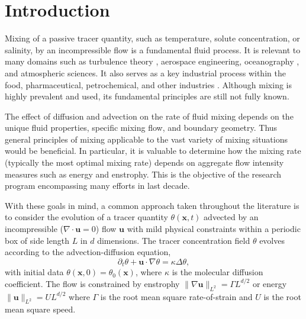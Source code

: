 \documentclass[12pt]{iopart}
\newcommand{\ltwo}[1]{\|#1\|_{L^{2}}}
\renewcommand{\vec}[1]{\mathbf{#1}}
\renewcommand{\u}{\mathbf{u}}
\newcommand{\ppt}[1]{\partial_{t} #1}
\newcommand{\lap}{\Delta }
\begin{document}
%
% 
%

\section{Introduction}
\label{sec:introduction}

Mixing of a passive tracer quantity, such as temperature, solute concentration, or salinity, by an incompressible flow is a fundamental fluid process. It is relevant to many domains such as turbulence theory \cite{Dimotakis2005,Violeau2000a}, aerospace engineering, oceanography \cite{Wunsch2004}, and atmospheric sciences. It also serves as a key industrial process within the food, pharmaceutical, petrochemical, and other industries \cite{paul2004handbook}. Although mixing is highly prevalent and used, its fundamental principles are still not fully known.

The effect of diffusion and advection on the rate of fluid mixing depends on the unique fluid properties, specific mixing flow, and boundary geometry. Thus general principles of mixing applicable to the vast variety of mixing situations would be beneficial. In particular, it is valuable to determine how the mixing rate (typically the most optimal mixing rate) depends on aggregate flow intensity measures such as energy and enstrophy. This is the objective of the research program encompassing many efforts \cite{CS2013,GI2014,JLT2012,JFM2011, Miles2017a,  JLT2012, DF2014, GM2005} in last decade. 

With these goals in mind, a common approach taken throughout the literature is to consider the evolution of a tracer quantity $\theta (\vec{x},t)$ advected by an incompressible ($\nabla \cdot\vec{u}=0$) flow $\vec{u}$ with mild physical constraints within a periodic box  of side length $L$ in $d$ dimensions. The tracer concentration field $\theta$ evolves according to the advection-diffusion equation,
\begin{equation}
	\label{eq:PDE_advection}
	\ppt{\theta}+\mathbf{u}\cdot \nabla \theta=\kappa \lap\theta,
\end{equation}
with initial data $\theta(\mathbf{x},0)=\theta_{0}(\mathbf{x})$, where $\kappa$ is the molecular diffusion coefficient. The flow is constrained by enstrophy $\ltwo{\nabla\u} = \Gamma L^{d/2}$ or energy $\ltwo{\u} = UL^{d/2}$ where $\Gamma$ is the root mean square rate-of-strain and $U$ is the root mean square speed. 
\end{document}
